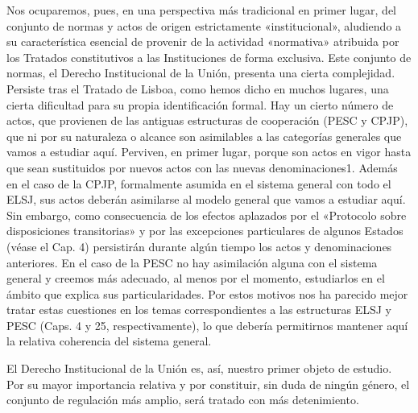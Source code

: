 \documentclass[10pt,a4paper]{article}
\begin{document}
Nos ocuparemos, pues, en una perspectiva más tradicional en primer lugar, del conjunto de normas y actos de origen estrictamente «institucional», aludiendo a su característica esencial de provenir de la actividad «normativa» atribuida por los Tratados constitutivos a las Instituciones de forma exclusiva. Este conjunto de normas, el Derecho Institucional de la Unión, presenta una cierta complejidad. Persiste tras el Tratado de Lisboa, como hemos dicho en muchos lugares, una cierta dificultad para su propia identificación formal. Hay un cierto número de actos, que provienen de las antiguas estructuras de cooperación (PESC y CPJP), que ni por su naturaleza o alcance son asimilables a las categorías generales que vamos a estudiar aquí. Perviven, en primer lugar, porque son actos en vigor hasta que sean sustituidos por nuevos actos con las nuevas denominaciones1. Además en el caso de la CPJP, formalmente asumida en el sistema general con todo el ELSJ, sus actos deberán asimilarse al modelo general que vamos a estudiar aquí. Sin embargo, como consecuencia de los efectos aplazados por el «Protocolo sobre disposiciones transitorias» y por las excepciones particulares de algunos Estados (véase el Cap. 4) persistirán durante algún tiempo los actos y denominaciones anteriores. En el caso de la PESC no hay asimilación alguna con el sistema general y creemos más adecuado, al menos por el momento, estudiarlos en el ámbito que explica sus particularidades. Por estos motivos nos ha parecido mejor tratar estas cuestiones en los temas correspondientes a las estructuras ELSJ y PESC (Caps. 4 y 25, respectivamente), lo que debería permitirnos mantener aquí la relativa coherencia del sistema general.

El Derecho Institucional de la Unión es, así, nuestro primer objeto de estudio. Por su mayor importancia relativa y por constituir, sin duda de ningún género, el conjunto de regulación más amplio, será tratado con más detenimiento. 
\end{document}
